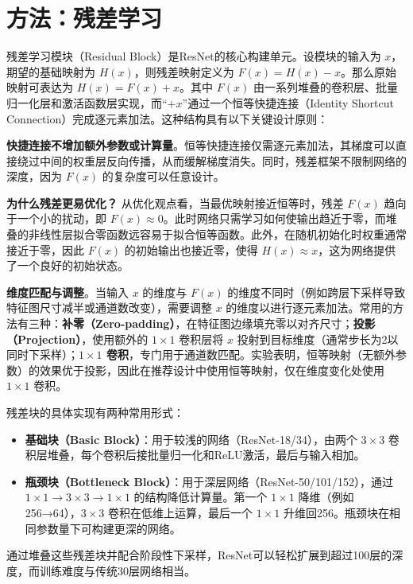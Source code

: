 \section{方法：残差学习}

残差学习模块（Residual Block）是ResNet的核心构建单元。设模块的输入为 $x$，期望的基础映射为 $H(x)$，则残差映射定义为 $F(x) = H(x) - x$。那么原始映射可表达为 $H(x) = F(x) + x$。其中 $F(x)$ 由一系列堆叠的卷积层、批量归一化层和激活函数层实现，而“$+x$”通过一个恒等快捷连接（Identity Shortcut Connection）完成逐元素加法。这种结构具有以下关键设计原则：

\textbf{快捷连接不增加额外参数或计算量}。恒等快捷连接仅需逐元素加法，其梯度可以直接绕过中间的权重层反向传播，从而缓解梯度消失。同时，残差框架不限制网络的深度，因为 $F(x)$ 的复杂度可以任意设计。

\textbf{为什么残差更易优化？} 从优化观点看，当最优映射接近恒等时，残差 $F(x)$ 趋向于一个小的扰动，即 $F(x) \approx 0$。此时网络只需学习如何使输出趋近于零，而堆叠的非线性层拟合零函数远容易于拟合恒等函数。此外，在随机初始化时权重通常接近于零，因此 $F(x)$ 的初始输出也接近零，使得 $H(x) \approx x$，这为网络提供了一个良好的初始状态。

\textbf{维度匹配与调整}。当输入 $x$ 的维度与 $F(x)$ 的维度不同时（例如跨层下采样导致特征图尺寸减半或通道数改变），需要调整 $x$ 的维度以进行逐元素加法。常用的方法有三种：\textbf{补零（Zero-padding）}，在特征图边缘填充零以对齐尺寸；\textbf{投影（Projection）}，使用额外的 $1\times1$ 卷积层将 $x$ 投射到目标维度（通常步长为2以同时下采样）；\textbf{$1\times1$ 卷积}，专门用于通道数匹配。实验表明，恒等映射（无额外参数）的效果优于投影，因此在推荐设计中使用恒等映射，仅在维度变化处使用 $1\times1$ 卷积。

残差块的具体实现有两种常用形式：
\begin{itemize}
    \item \textbf{基础块（Basic Block）}：用于较浅的网络（ResNet-18/34），由两个 $3\times3$ 卷积层堆叠，每个卷积后接批量归一化和ReLU激活，最后与输入相加。
    \item \textbf{瓶颈块（Bottleneck Block）}：用于深层网络（ResNet-50/101/152），通过 $1\times1 \rightarrow 3\times3 \rightarrow 1\times1$ 的结构降低计算量。第一个 $1\times1$ 降维（例如 256→64），$3\times3$ 卷积在低维上运算，最后一个 $1\times1$ 升维回256。瓶颈块在相同参数量下可构建更深的网络。
\end{itemize}

通过堆叠这些残差块并配合阶段性下采样，ResNet可以轻松扩展到超过100层的深度，而训练难度与传统30层网络相当。